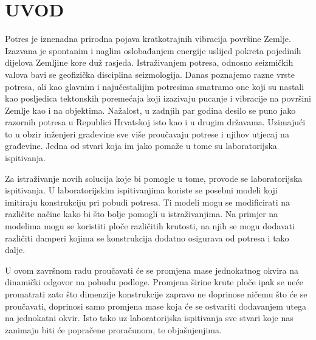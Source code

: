 \documentclass[12pt]{book}
\begin{document}
%


\pagestyle{empty}


\cleardoublepage
\begin{flushleft}
	
\end{flushleft}

\setcounter{page}{1}

\tableofcontents
\cleardoublepage

\listoffigures

\cleardoublepage
{}\listoftables


\clearpage

\pagestyle{plain}
\setcounter{page}{1}

\chapter{\uppercase{Uvod}}
Potres je iznenadna prirodna pojava kratkotrajnih vibracija površine Zemlje. Izazvana je spontanim i naglim oslobađanjem energije uslijed pokreta pojedinih dijelova Zemljine kore duž rasjeda. Istraživanjem potresa, odnosno seizmičkih valova bavi se geofizička disciplina seizmologija. Danas poznajemo razne vrste potresa, ali kao glavnim i najučestalijim potresima smatramo one koji su nastali kao posljedica tektonskih poremećaja koji izazivaju pucanje i vibracije na površini Zemlje kao i na objektima. Nažalost, u zadnjih par godina desilo se puno jako razornih potresa u Republici Hrvatskoj isto kao i u drugim državama. Uzimajući to u obzir inženjeri građevine sve više proučavaju potrese i njihov utjecaj na građevine. Jedna od stvari koja im jako pomaže u tome su laboratorijska ispitivanja.

Za istraživanje novih solucija koje bi pomogle u tome, provode se laboratorijska ispitivanja. U laboratorijskim ispitivanjima koriste se posebni modeli koji imitiraju konstrukciju pri pobudi potresa. Ti modeli mogu se modificirati na različite načine kako bi što bolje pomogli u istraživanjima. Na primjer na modelima mogu se koristiti ploče različitih krutosti, na njih se mogu dodavati različiti damperi kojima se konstrukcija dodatno osigurava od potresa i tako dalje.  

U ovom završnom radu proučavati će se promjena mase jednokatnog okvira na dinamički odgovor na pobudu podloge. Promjena širine krute ploče ipak se neće promatrati zato što dimenzije konstrukcije zapravo ne doprinose ničemu što će se proučavati, doprinosi samo promjena mase koja će se ostvariti dodavanjem utega na jednokatni okvir. Isto tako uz laboratorijska ispitivanja sve stvari koje nas zanimaju biti će popračene proračunom, te objašnjenjima.
\end{document}
